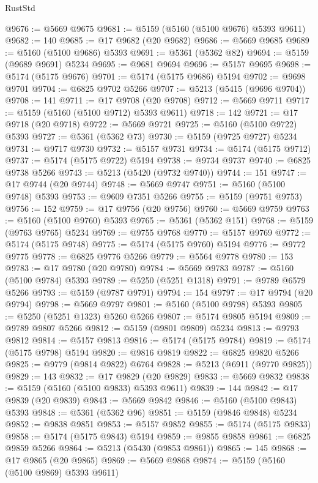 \begin{lexlean}{RustStd}
\begin{coremodule}
@9676 := @5669 @9675
@9681 := @5159 (@5160 (@5100 @9676) @5393 @9611)
@9682 := 140
@9685 := @17 @9682 (@20 @9682)
@9686 := @5669 @9685
@9689 := @5160 (@5100 @9686) @5393
@9691 := @5361 (@5362 @82)
@9694 := @5159 (@9689 @9691) @5234
@9695 := @9681 @9694
@9696 := @5157 @9695
@9698 := @5174 (@5175 @9676)
@9701 := @5174 (@5175 @9686) @5194
@9702 := @9698 @9701
@9704 := @6825 @9702 @5266
@9707 := @5213 (@5415 (@9696 @9704))
@9708 := 141
@9711 := @17 @9708 (@20 @9708)
@9712 := @5669 @9711
@9717 := @5159 (@5160 (@5100 @9712) @5393 @9611)
@9718 := 142
@9721 := @17 @9718 (@20 @9718)
@9722 := @5669 @9721
@9725 := @5160 (@5100 @9722) @5393
@9727 := @5361 (@5362 @73)
@9730 := @5159 (@9725 @9727) @5234
@9731 := @9717 @9730
@9732 := @5157 @9731
@9734 := @5174 (@5175 @9712)
@9737 := @5174 (@5175 @9722) @5194
@9738 := @9734 @9737
@9740 := @6825 @9738 @5266
@9743 := @5213 (@5420 (@9732 @9740))
@9744 := 151
@9747 := @17 @9744 (@20 @9744)
@9748 := @5669 @9747
@9751 := @5160 (@5100 @9748) @5393
@9753 := @9609 @7351 @5266
@9755 := @5159 (@9751 @9753)
@9756 := 152
@9759 := @17 @9756 (@20 @9756)
@9760 := @5669 @9759
@9763 := @5160 (@5100 @9760) @5393
@9765 := @5361 (@5362 @151)
@9768 := @5159 (@9763 @9765) @5234
@9769 := @9755 @9768
@9770 := @5157 @9769
@9772 := @5174 (@5175 @9748)
@9775 := @5174 (@5175 @9760) @5194
@9776 := @9772 @9775
@9778 := @6825 @9776 @5266
@9779 := @5564 @9778
@9780 := 153
@9783 := @17 @9780 (@20 @9780)
@9784 := @5669 @9783
@9787 := @5160 (@5100 @9784) @5393
@9789 := @5250 (@5251 @1318)
@9791 := @9789 @6579 @5266
@9793 := @5159 (@9787 @9791)
@9794 := 154
@9797 := @17 @9794 (@20 @9794)
@9798 := @5669 @9797
@9801 := @5160 (@5100 @9798) @5393
@9805 := @5250 (@5251 @1323) @5260 @5266
@9807 := @5174 @9805 @5194
@9809 := @9789 @9807 @5266
@9812 := @5159 (@9801 @9809) @5234
@9813 := @9793 @9812
@9814 := @5157 @9813
@9816 := @5174 (@5175 @9784)
@9819 := @5174 (@5175 @9798) @5194
@9820 := @9816 @9819
@9822 := @6825 @9820 @5266
@9825 := @9779 (@9814 @9822) @6764
@9828 := @5213 (@6911 (@9770 @9825))
@9829 := 143
@9832 := @17 @9829 (@20 @9829)
@9833 := @5669 @9832
@9838 := @5159 (@5160 (@5100 @9833) @5393 @9611)
@9839 := 144
@9842 := @17 @9839 (@20 @9839)
@9843 := @5669 @9842
@9846 := @5160 (@5100 @9843) @5393
@9848 := @5361 (@5362 @96)
@9851 := @5159 (@9846 @9848) @5234
@9852 := @9838 @9851
@9853 := @5157 @9852
@9855 := @5174 (@5175 @9833)
@9858 := @5174 (@5175 @9843) @5194
@9859 := @9855 @9858
@9861 := @6825 @9859 @5266
@9864 := @5213 (@5430 (@9853 @9861))
@9865 := 145
@9868 := @17 @9865 (@20 @9865)
@9869 := @5669 @9868
@9874 := @5159 (@5160 (@5100 @9869) @5393 @9611)

\end{coremodule}
\end{lexlean}
